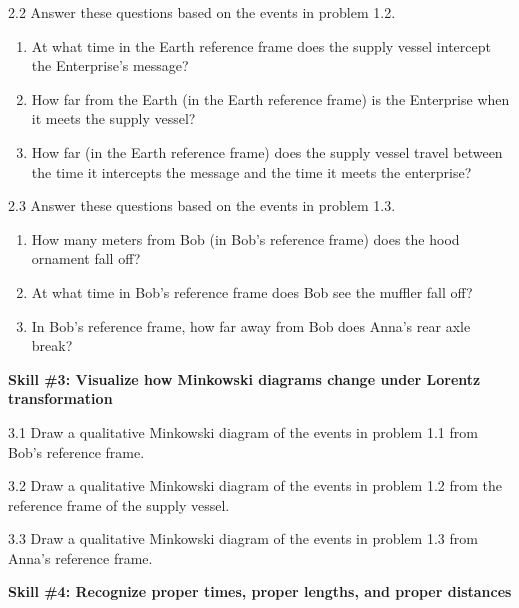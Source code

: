 2.2 Answer these questions based on the events in problem 1.2.
\begin{enumerate}[nosep,label=(\emph{\alph*})]
\item At what time in the Earth reference frame does the supply vessel intercept the Enterprise's message?
\answerspace{0.3in}

\item How far from the Earth (in the Earth reference frame) is the Enterprise when it meets the supply vessel?
\answerspace{0.3in}

\item How far (in the Earth reference frame) does the supply vessel travel between the time it intercepts the message and the time it meets the enterprise?
\answerspace{0.3in}

\end{enumerate}

2.3 Answer these questions based on the events in problem 1.3.
\begin{enumerate}[nosep,label=(\emph{\alph*})]
\item How many meters from Bob (in Bob's reference frame) does the hood ornament fall off?
\answerspace{0.3in}

\item At what time in Bob's reference frame does Bob see the muffler fall off?
\answerspace{0.3in}

\item In Bob's reference frame, how far away from Bob does Anna's rear axle break?
\answerspace{0.3in}
  
\end{enumerate}
\textbf{Skill \#3: Visualize how Minkowski diagrams change under Lorentz transformation}

3.1 Draw a qualitative Minkowski diagram of the events in problem 1.1 from Bob's reference frame.  
\bigskip

3.2 Draw a qualitative Minkowski diagram of the events in problem 1.2 from the reference frame of the supply vessel.  
\bigskip

3.3 Draw a qualitative Minkowski diagram of the events in problem 1.3 from Anna's reference frame.  
\bigskip
\bigskip

\pagebreak




\textbf{Skill \#4: Recognize proper times, proper lengths, and proper distances}

